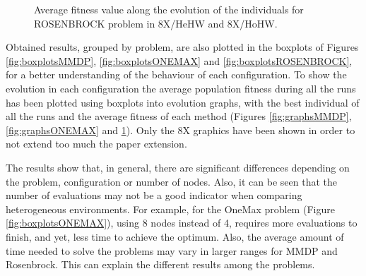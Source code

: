 \documentclass[final,1p,times]{elsarticle}
\begin{document}
\begin{figure}[htb]
\caption{Average fitness value along the evolution of the individuals for ROSENBROCK problem in 8X/HeHW and 8X/HoHW.}
\label{fig:graphsROSENBROCK}
\end{figure}



Obtained results, grouped by problem, are also plotted in the boxplots of Figures \ref{fig:boxplotsMMDP}, \ref{fig:boxplotsONEMAX} and \ref{fig:boxplotsROSENBROCK}, for a better understanding of the behaviour of each configuration. To show the evolution in each configuration the average population fitness during all the runs has been plotted using boxplots into evolution graphs, with the best individual of all the runs and the average fitness of each method (Figures \ref{fig:graphsMMDP}, \ref{fig:graphsONEMAX} and \ref{fig:graphsROSENBROCK}). 
Only the 8X graphics have been shown in order to not extend too much the paper extension. 

The results show that, in general, there are significant differences
depending on the problem, configuration or number of nodes. Also, it
can be seen that the number of evaluations may not be a good indicator
when comparing heterogeneous environments. For example, for the OneMax
problem (Figure \ref{fig:boxplotsONEMAX}), using 8 nodes instead of 4,
requires more evaluations to finish, and yet, less time to achieve the
optimum.  
Also, the average amount of time needed to solve the problems may vary
in larger ranges for MMDP and Rosenbrock. This can explain the different results
among the problems.  
\end{document}
